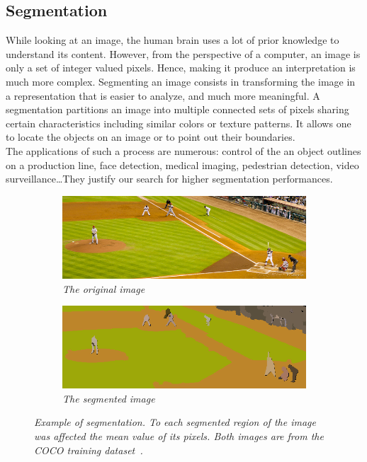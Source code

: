 \documentclass{article}
\begin{document}
    \subsection{Segmentation}
        While looking at an image, the human brain uses a lot of prior knowledge to understand its content. However, from the perspective of a computer, an image is only a set of integer valued pixels. Hence, making it produce an interpretation is much more complex. Segmenting an image consists in transforming the image in a representation that is easier to analyze, and much more meaningful. A segmentation partitions an image into multiple connected sets of pixels sharing certain characteristics including similar colors or texture patterns. It allows one to locate the objects on an image or to point out their boundaries.\\
        The applications of such a process are numerous: control of the an object outlines on a production line, face detection, medical imaging, pedestrian detection, video surveillance\ldots They justify our search for higher segmentation performances.

        \begin{figure}[!ht]
        \centering
        \begin{subfigure}{.49\linewidth}
            \centering
            \includegraphics[width=0.9\linewidth]{pics/img_segm1.jpg}
            \caption{\textit{The original image}}
        \end{subfigure}
        \begin{subfigure}{.49\linewidth}
            \centering
            \includegraphics[width=0.9\linewidth]{pics/img_segm2.png}
            \caption{\textit{The segmented image}}
        \end{subfigure}
            \caption{\textit{Example of segmentation. To each segmented region of the image was affected the mean value of its pixels. Both images are from the COCO training dataset~\cite{microsoft2014}.}}
            \label{fig:segm}
        \end{figure}
\end{document}
